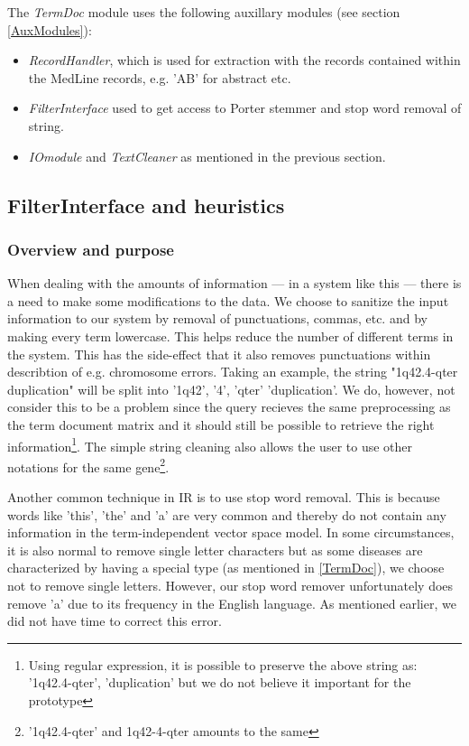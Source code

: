 The \textit{TermDoc} module uses the following auxillary modules (see
section \ref{AuxModules}):

\begin{itemize}
  \item \textit{RecordHandler}, which is used for extraction with the
    records contained within the MedLine records, e.g. 'AB' for
    abstract etc.
  \item \textit{FilterInterface} used to get access to Porter stemmer and stop
word removal of string.
  \item \textit{IOmodule} and \textit{TextCleaner} as mentioned in the
    previous section.
\end{itemize}


\subsection{FilterInterface and heuristics}

\subsubsection{Overview and purpose}
When dealing with the amounts of information --- in a system like this ---
there is a need to make some modifications to the data. We choose to
sanitize the input information to our system by removal of
punctuations, commas, etc. and by making every term lowercase. This
helps reduce the number of different terms in the system. This has the
side-effect that it also removes punctuations within describtion of
e.g. chromosome errors. Taking an example, the string "1q42.4-qter
duplication" will be split into '1q42', '4', 'qter' 'duplication'. We
do, however, not consider this to be a problem since the query
recieves the same preprocessing as the term document matrix and it
should still be possible to retrieve the right
information\footnote{Using regular expression, it is possible to
  preserve the above string as: '1q42.4-qter', 'duplication' but we do
  not believe it important for the prototype}. The simple string
cleaning also allows the user to use other notations for the same
gene\footnote{'1q42.4-qter' and 1q42-4-qter amounts to the same}.

Another common technique in IR is to use stop word removal. This is
because words like 'this', 'the' and 'a' are very common and thereby
do not contain any information in the term-independent vector space
model. In some circumstances, it is also normal to remove single letter
characters but as some diseases are characterized by having a special
type (as mentioned in \ref{TermDoc}), we choose not to remove single
letters. However, our stop word remover unfortunately does remove 'a'
due to its frequency in the English language. As mentioned earlier, we
did not have time to correct this error.

